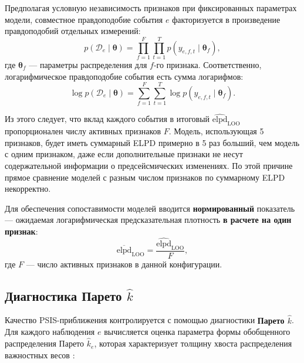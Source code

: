 \documentclass[14pt]{mmcs_article}
\begin{document}
Предполагая условную независимость признаков при
фиксированных параметрах модели, совместное правдоподобие
события $e$ факторизуется в произведение правдоподобий
отдельных измерений:
\begin{equation}
	p(\mathcal{D}_e \mid \boldsymbol{\theta}) = 
	\prod_{f=1}^{F} \prod_{t=1}^{T} 
	p(y_{e,f,t} \mid \boldsymbol{\theta}_f),
\end{equation}
где $\boldsymbol{\theta}_f$ — параметры распределения для
$f$-го признака. Соответственно, логарифмическое
правдоподобие события есть сумма логарифмов:
\begin{equation}
	\log p(\mathcal{D}_e \mid \boldsymbol{\theta}) = 
	\sum_{f=1}^{F} \sum_{t=1}^{T} 
	\log p(y_{e,f,t} \mid \boldsymbol{\theta}_f).
\end{equation}

Из этого следует, что вклад каждого события в итоговый
$\widehat{\mathrm{elpd}}_{\mathrm{LOO}}$ пропорционален числу
активных признаков $F$. Модель, использующая 5 признаков, будет
иметь суммарный ELPD примерно в 5 раз больший, чем модель с
одним признаком, даже если дополнительные признаки не несут
содержательной информации о предсейсмических изменениях. По этой
причине прямое сравнение моделей с разным числом признаков по
суммарному ELPD некорректно.

Для обеспечения сопоставимости моделей вводится
\textbf{нормированный} показатель — ожидаемая логарифмическая
предсказательная плотность \textbf{в расчете на один признак}:
\begin{equation}\label{eq:elpd_per_feature}
	\overline{\mathrm{elpd}}_{\mathrm{LOO}} = 
	\frac{\widehat{\mathrm{elpd}}_{\mathrm{LOO}}}{F},
\end{equation}
где $F$ — число активных признаков в данной конфигурации.


\subsection*{Диагностика Парето $\hat{k}$}

Качество PSIS-приближения контролируется с помощью
диагностики \textbf{Парето $\hat{k}$}. Для каждого наблюдения
$e$ вычисляется оценка параметра формы обобщенного
распределения Парето $\hat{k}_e$, которая характеризует
толщину хвоста распределения важностных весов
\cite{Vehtari2017, Vehtari2024}:
\end{document}
